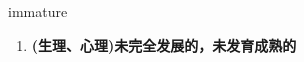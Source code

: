 
\begin{frame}
{\huge immature}
\begin{center}
\begin{enumerate}\Large
  \item \textbf{(生理、心理)未完全发展的，未发育成熟的}
\end{enumerate}
\end{center}
\end{frame}
